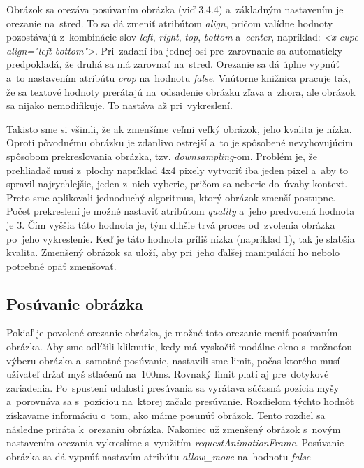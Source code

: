 Obrázok sa orezáva posúvaním obrázka (viď 3.4.4) a~základným nastavením je orezanie na~stred. To sa dá zmeniť atribútom \emph{align}, pričom valídne hodnoty pozostávajú z~kombinácie slov \emph{left}, \emph{right}, \emph{top}, \emph{bottom} a~\emph{center}, napríklad: \emph{<x-cupe align="left bottom"\textgreater}. Pri~zadaní iba jednej osi pre~zarovnanie sa automaticky predpokladá, že druhá sa má zarovnať na~stred. Orezanie sa dá úplne vypnúť a~to nastavením atribútu \emph{crop} na~hodnotu \emph{false}. Vnútorne knižnica pracuje tak, že sa textové hodnoty prerátajú na~odsadenie obrázku zľava a~zhora, ale obrázok sa nijako nemodifikuje. To nastáva až pri~vykreslení.

Takisto sme si všimli, že ak zmenšíme veľmi veľký obrázok, jeho kvalita je nízka. Oproti pôvodnému obrázku je zdanlivo ostrejší a~to je spôsobené nevyhovujúcim spôsobom prekresľovania obrázka, tzv. \emph{downsampling}-om. Problém je, že prehliadač musí z~plochy napríklad 4x4 pixely vytvoriť iba jeden pixel a~aby to spravil najrychlejšie, jeden z~nich vyberie, pričom sa neberie do~úvahy kontext. Preto sme aplikovali jednoduchý algoritmus, ktorý obrázok zmenší postupne. Počet prekreslení je možné nastaviť atribútom \emph{quality} a~jeho predvolená hodnota je 3. Čím vyššia táto hodnota je, tým dlhšie trvá proces od~zvolenia obrázka po~jeho vykreslenie. Keď je táto hodnota príliš nízka (napríklad 1), tak je slabšia kvalita. Zmenšený obrázok sa uloží, aby pri~jeho ďalšej manipulácií ho nebolo potrebné opäť zmenšovať.

\subsection{Posúvanie obrázka}

Pokiaľ je povolené orezanie obrázka, je možné toto orezanie meniť posúvaním obrázka. Aby sme odlíšili kliknutie, kedy má vyskočiť modálne okno s~možnoťou výberu obrázka a~samotné posúvanie, nastavili sme limit, počas ktorého musí užívateľ držať myš stlačenú na~100ms. Rovnaký limit platí aj pre~dotykové zariadenia. Po~spustení udalosti presúvania sa vyrátava súčasná pozícia myšy a~porovnáva sa s~pozíciou na~ktorej začalo presúvanie. Rozdielom týchto hodnôt získavame informáciu o~tom, ako máme posunúť obrázok. Tento rozdiel sa následne priráta k~orezaniu obrázka. Nakoniec už zmenšený obrázok s~novým nastavením orezania vykreslíme s~využitím \emph{requestAnimationFrame}. Posúvanie obrázka sa dá vypnúť nastavím atribútu \emph{allow_move} na~hodnotu \emph{false}

